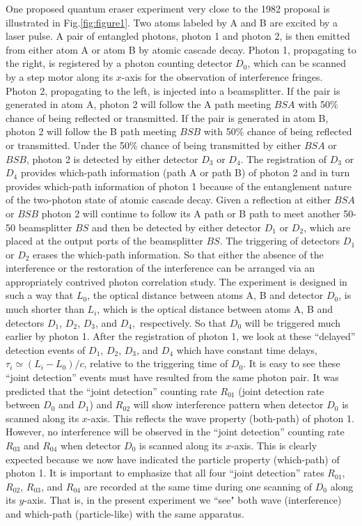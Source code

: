 One proposed quantum eraser experiment very close to the 1982 proposal is illustrated in
Fig.\ref{fig:figure1}. Two atoms labeled by A and B are excited by a laser pulse. A pair
of entangled photons, photon 1 and photon 2, is then emitted from either atom A or atom B
by atomic cascade decay. Photon 1, propagating to the right, is registered by a photon
counting detector $D_{0}$, which can be scanned by a step motor along its $x$-axis for
the observation of interference fringes. Photon 2, propagating to the left, is injected
into a beamsplitter. If the pair is generated in atom A, photon 2 will follow the A path
meeting $BSA$ with 50\% chance of being reflected or transmitted. If the pair is
generated in atom B, photon 2 will follow the B path meeting $BSB$ with 50\% chance of
being reflected or transmitted. Under the 50\% chance of being transmitted by either
$BSA$ or $BSB$, photon 2 is detected by either detector $D_{3}$ or $D_{4}$. The
registration of $D_{3}$ or $D_{4}$ provides which-path information (path A or path B) of
photon 2 and in turn provides which-path information of photon 1 because of the
entanglement nature of the two-photon state of atomic cascade decay. Given a reflection
at either $BSA$ or $BSB$ photon 2 will continue to follow its A path or B path to meet
another 50-50 beamsplitter $BS$ and then be detected by either detector $D_{1}$ or
$D_{2}$, which are placed at the output ports of the beamsplitter $BS$. The triggering of
detectors $D_{1}$ or $D_{2}$ erases the which-path information. So that either the
absence of the interference or the restoration of the interference can be arranged via an
appropriately contrived photon correlation study. The experiment is designed in such a
way that $L_{0}$, the optical distance between atoms A, B and detector $D_{0}$, is much
shorter than $L_{i}$, which is the optical distance between atoms A, B and detectors
$D_{1}$, $D_{2}$, $D_{3}$, and $D_{4},$ respectively. So that $D_{0}$ will be triggered
much earlier by photon 1. After the registration of photon 1, we look at these
``delayed'' detection events of $D_{1}$, $D_{2}$, $D_{3}$, and $D_{4}$ which have
constant time delays, $\tau _{i}\simeq (L_{i}-L_{0})/c$, relative to the triggering time
of $D_{0}$. It is easy to see these ``joint detection'' events must have resulted from
the same photon pair. It was predicted that the ``joint detection'' counting rate
$R_{01}$ (joint detection rate between $D_{0}$ and $D_{1}$) and $R_{02}$ will show
interference pattern when detector $D_{0}$ is scanned along its $x$-axis. This reflects
the wave property (both-path) of photon 1. However, no interference will be observed in
the ``joint detection'' counting rate $R_{03}$ and $R_{04}$ when detector $D_{0}$ is
scanned along its $x$-axis. This is clearly expected because we now have indicated the
particle property (which-path) of photon 1. It is important to emphasize
that all four ``joint detection'' rates $R_{01}$, $R_{02}$, $R_{03}$, and $%
R_{04}$ are recorded at the same time during one scanning of $D_{0}$ along its $y$-axis.
That is, in the present experiment we ``see" both wave (interference) and which-path
(particle-like) with the same apparatus.

